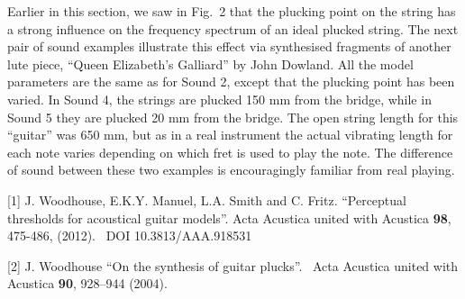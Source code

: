   Earlier in this section, we saw in Fig.\ 2 that the plucking point on the 
  string has a strong influence on the frequency spectrum of an ideal plucked 
  string. The next pair of sound examples illustrate this effect via 
  synthesised fragments of another lute piece, ``Queen Elizabeth's Galliard'' 
  by John Dowland. All the model parameters are the same as for Sound 2, except 
  that the plucking point has been varied. In Sound 4, the strings are plucked 
  150 mm from the bridge, while in Sound 5 they are plucked 20 mm from the 
  bridge. The open string length for this ``guitar'' was 650 mm, but as in a 
  real instrument the actual vibrating length for each note varies depending on 
  which fret is used to play the note. The difference of sound between these 
  two examples is encouragingly familiar from real playing. 



  \sectionreferences{}[1] J. Woodhouse, E.K.Y. Manuel, L.A. Smith and C. Fritz. 
  ``Perceptual thresholds for acoustical guitar models''. Acta Acustica united 
  with Acustica \textbf{98}, 475-486, (2012).~ DOI 10.3813/AAA.918531 

  [2] J. Woodhouse ``On the synthesis of guitar plucks''.~ Acta Acustica united 
  with Acustica \textbf{90}, 928–944 (2004). 